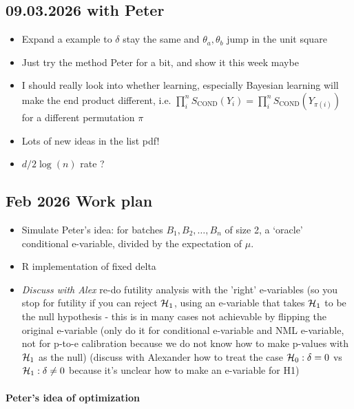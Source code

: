 \subsection*{09.03.2026 with Peter}

\begin{itemize}
	\item Expand a example to $\delta$ stay the same and $\theta_a,\theta_b$ jump in the unit square
	\item Just try the method Peter for a bit, and show it this week maybe
	\item I should really look into whether learning, especially Bayesian learning will make the end product different, i.e.
	      $\prod_i^n S_{\mathrm{COND}}(Y_i) = \prod_i^n S_{\text{COND}}(Y_{\pi(i)})$ for a different permutation $\pi$
	\item Lots of new ideas in the list pdf!
	\item $d/2\log(n)$ rate ?
\end{itemize}

\subsection*{Feb 2026 Work plan}

\begin{itemize}
	\item Simulate Peter's idea: for batches $B_1, B_2, \dots, B_n$ of size 2, a `oracle' conditional e-variable,
	      divided by the expectation of $\mu$.
	\item R implementation of fixed delta
	\item \emph{Discuss with Alex} re-do futility analysis with the 'right' e-variables (so you stop for futility if you can reject $\mathcal{H}_1$, using an e-variable that takes $\mathcal{H}_1$ to be the null hypothesis - this is in many cases not achievable by flipping the original e-variable
	      (only do it for conditional e-variable and NML e-variable, not for p-to-e calibration because we do not know how to make p-values with $\mathcal{H}_1$ as the null)
	      (discuss with Alexander how to treat the case $\mathcal{H}_0: \delta=0$ vs $\mathcal{H}_1: \delta \neq 0$ because it's unclear how to make an e-variable for H1)
\end{itemize}

\paragraph*{Peter's idea of optimization}

